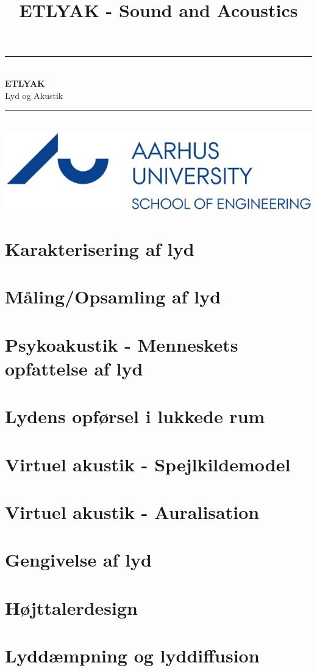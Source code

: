 \documentclass[12pt,a4paper,danish,oneside]{book}
\title{ETLYAK - Sound and Acoustics}
\newcommand{\HRule}{\rule{\linewidth}{0.5mm}}
\begin{document}
\begin{titlepage}
	\clearpage\thispagestyle{empty}

	\begin{center}
		\HRule \\[0.4cm]
		{\huge \bfseries ETLYAK} \\[.3cm] {\huge Lyd og Akustik}\\[0cm]		
		\HRule \\[3.4cm]
		\includegraphics[width=0.5\linewidth]{graphics/au}
	\end{center}
	\renewcommand{\contentsname}{Indholdsfortegnelse}
	\tableofcontents

\end{titlepage}
 
\listoffixmes

\chapter{Karakterisering af lyd}


\chapter{Måling/Opsamling af lyd}


\chapter{Psykoakustik - Menneskets opfattelse af lyd}


\chapter{Lydens opførsel i lukkede rum}


\chapter{Virtuel akustik - Spejlkildemodel}


\chapter{Virtuel akustik - Auralisation}


\chapter{Gengivelse af lyd}


\chapter{Højttalerdesign}

\chapter{Lyddæmpning og lyddiffusion}
\end{document}

